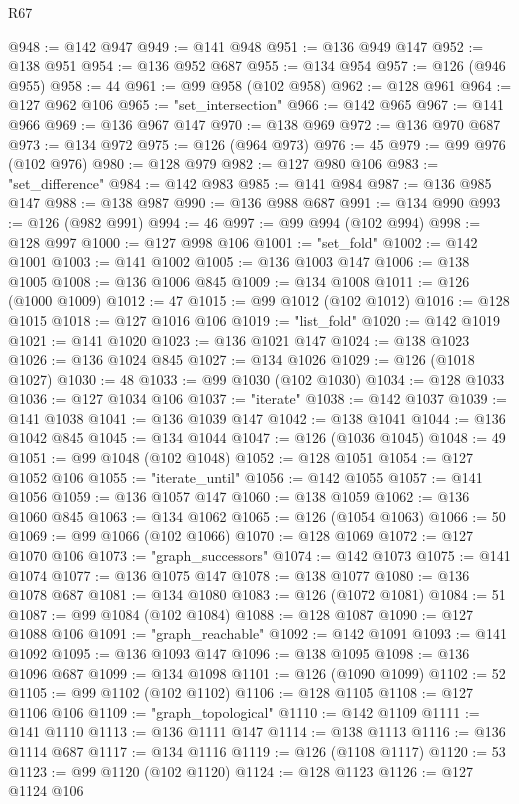\begin{lexlean}{R67}
\begin{coremodule}
@948 := @142 @947
@949 := @141 @948
@951 := @136 @949 @147
@952 := @138 @951
@954 := @136 @952 @687
@955 := @134 @954
@957 := @126 (@946 @955)
@958 := 44
@961 := @99 @958 (@102 @958)
@962 := @128 @961
@964 := @127 @962 @106
@965 := "set_intersection"
@966 := @142 @965
@967 := @141 @966
@969 := @136 @967 @147
@970 := @138 @969
@972 := @136 @970 @687
@973 := @134 @972
@975 := @126 (@964 @973)
@976 := 45
@979 := @99 @976 (@102 @976)
@980 := @128 @979
@982 := @127 @980 @106
@983 := "set_difference"
@984 := @142 @983
@985 := @141 @984
@987 := @136 @985 @147
@988 := @138 @987
@990 := @136 @988 @687
@991 := @134 @990
@993 := @126 (@982 @991)
@994 := 46
@997 := @99 @994 (@102 @994)
@998 := @128 @997
@1000 := @127 @998 @106
@1001 := "set_fold"
@1002 := @142 @1001
@1003 := @141 @1002
@1005 := @136 @1003 @147
@1006 := @138 @1005
@1008 := @136 @1006 @845
@1009 := @134 @1008
@1011 := @126 (@1000 @1009)
@1012 := 47
@1015 := @99 @1012 (@102 @1012)
@1016 := @128 @1015
@1018 := @127 @1016 @106
@1019 := "list_fold"
@1020 := @142 @1019
@1021 := @141 @1020
@1023 := @136 @1021 @147
@1024 := @138 @1023
@1026 := @136 @1024 @845
@1027 := @134 @1026
@1029 := @126 (@1018 @1027)
@1030 := 48
@1033 := @99 @1030 (@102 @1030)
@1034 := @128 @1033
@1036 := @127 @1034 @106
@1037 := "iterate"
@1038 := @142 @1037
@1039 := @141 @1038
@1041 := @136 @1039 @147
@1042 := @138 @1041
@1044 := @136 @1042 @845
@1045 := @134 @1044
@1047 := @126 (@1036 @1045)
@1048 := 49
@1051 := @99 @1048 (@102 @1048)
@1052 := @128 @1051
@1054 := @127 @1052 @106
@1055 := "iterate_until"
@1056 := @142 @1055
@1057 := @141 @1056
@1059 := @136 @1057 @147
@1060 := @138 @1059
@1062 := @136 @1060 @845
@1063 := @134 @1062
@1065 := @126 (@1054 @1063)
@1066 := 50
@1069 := @99 @1066 (@102 @1066)
@1070 := @128 @1069
@1072 := @127 @1070 @106
@1073 := "graph_successors"
@1074 := @142 @1073
@1075 := @141 @1074
@1077 := @136 @1075 @147
@1078 := @138 @1077
@1080 := @136 @1078 @687
@1081 := @134 @1080
@1083 := @126 (@1072 @1081)
@1084 := 51
@1087 := @99 @1084 (@102 @1084)
@1088 := @128 @1087
@1090 := @127 @1088 @106
@1091 := "graph_reachable"
@1092 := @142 @1091
@1093 := @141 @1092
@1095 := @136 @1093 @147
@1096 := @138 @1095
@1098 := @136 @1096 @687
@1099 := @134 @1098
@1101 := @126 (@1090 @1099)
@1102 := 52
@1105 := @99 @1102 (@102 @1102)
@1106 := @128 @1105
@1108 := @127 @1106 @106
@1109 := "graph_topological"
@1110 := @142 @1109
@1111 := @141 @1110
@1113 := @136 @1111 @147
@1114 := @138 @1113
@1116 := @136 @1114 @687
@1117 := @134 @1116
@1119 := @126 (@1108 @1117)
@1120 := 53
@1123 := @99 @1120 (@102 @1120)
@1124 := @128 @1123
@1126 := @127 @1124 @106

\end{coremodule}
\end{lexlean}
